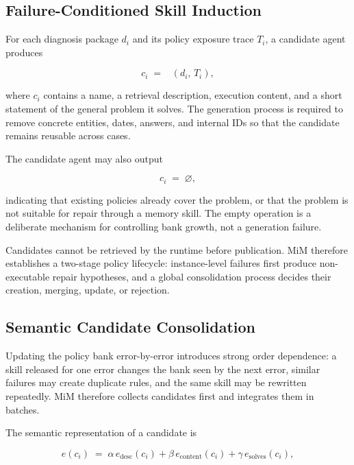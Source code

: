 \documentclass[11pt]{article}
\DeclareMathOperator{\Cand}{G_{cand}}
\begin{document}
\subsection{Failure-Conditioned Skill Induction}
\label{sec:method-induction}

For each diagnosis package $d_i$ and its policy exposure trace $T_i$, a
candidate agent produces

\begin{equation}
\label{eq:candidate}
c_i \;=\; \Cand(d_i,\,T_i),
\end{equation}

\noindent where $c_i$ contains a name, a retrieval description, execution
content, and a short statement of the general problem it solves. The generation
process is required to remove concrete entities, dates, answers, and internal
IDs so that the candidate remains reusable across cases.

The candidate agent may also output

\begin{equation}
\label{eq:nochange}
c_i \;=\; \varnothing,
\end{equation}

\noindent indicating that existing policies already cover the problem, or that
the problem is not suitable for repair through a memory skill. The empty
operation is a deliberate mechanism for controlling bank growth, not a
generation failure.

Candidates cannot be retrieved by the runtime before publication. MiM therefore
establishes a two-stage policy lifecycle: instance-level failures first produce
non-executable repair hypotheses, and a global consolidation process decides
their creation, merging, update, or rejection.

\subsection{Semantic Candidate Consolidation}
\label{sec:method-consolidation}

Updating the policy bank error-by-error introduces strong order dependence:
a skill released for one error changes the bank seen by the next error, similar
failures may create duplicate rules, and the same skill may be rewritten
repeatedly. MiM therefore collects candidates first and integrates them in
batches.

The semantic representation of a candidate is

\begin{equation}
\label{eq:cembed}
e(c_i) \;=\; \alpha\, e_{\mathrm{desc}}(c_i) + \beta\, e_{\mathrm{content}}(c_i)
+ \gamma\, e_{\mathrm{solves}}(c_i),
\end{equation}
\end{document}
